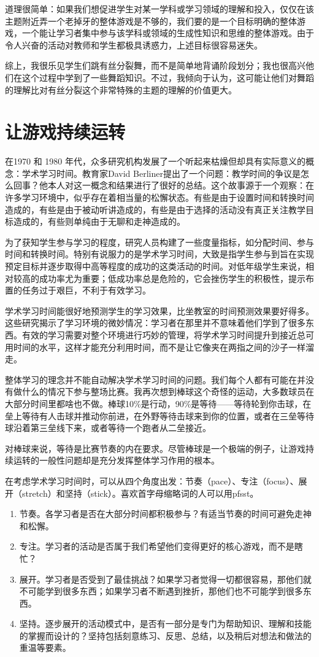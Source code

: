 道理很简单：如果我们想促进学生对某一学科或学习领域的理解和投入，仅仅在该主题附近弄一个老掉牙的整体游戏是不够的，我们要的是一个目标明确的整体游戏，一个能让学习者集中参与该学科或领域的生成性知识和思维的整体游戏。由于令人兴奋的活动对教师和学生都极具诱惑力，上述目标很容易迷失。

综上，我很乐见学生们跳有丝分裂舞，而不是简单地背诵阶段划分；我也很高兴他们在这个过程中学到了一些舞蹈知识。不过，我倾向于认为，这可能让他们对舞蹈的理解比对有丝分裂这个非常特殊的主题的理解的价值更大。

\section*{让游戏持续运转}

在1970 和 1980 年代，众多研究机构发展了一个听起来枯燥但却具有实际意义的概念：学术学习时间。教育家David Berliner提出了一个问题：教学时间的争议是怎么回事？他本人对这一概念和结果进行了很好的总结。这个故事源于一个观察：在许多学习环境中，似乎存在着相当量的松懈状态。有些是由于设置时间和转换时间造成的，有些是由于被动听讲造成的，有些是由于选择的活动没有真正关注教学目标造成的，有些则单纯由于无聊和走神造成的。

为了获知学生参与学习的程度，研究人员构建了一些度量指标，如分配时间、参与时间和转换时间。特别有说服力的是学术学习时间，大致是指学生参与到旨在实现预定目标并逐步取得中高等程度的成功的这类活动的时间。对低年级学生来说，相对较高的成功率尤为重要；低成功率总是危险的，它会挫伤学生的积极性，提示布置的任务过于艰巨，不利于有效学习。

学术学习时间能很好地预测学生的学习效果，比坐教室的时间预测效果要好得多。这些研究揭示了学习环境的微妙情况：学习者在那里并不意味着他们学到了很多东西。有效的学习需要对整个环境进行巧妙的管理，将学术学习时间提升到接近总可用时间的水平，这样才能充分利用时间，而不是让它像夹在两指之间的沙子一样溜走。

整体学习的理念并不能自动解决学术学习时间的问题。我们每个人都有可能在并没有做什么的情况下参与整场比赛。我再次想到棒球这个奇怪的运动，大多数球员在大部分时间里都啥也不做。棒球10\%是行动，90\%是等待——等待轮到你击球，在垒上等待有人击球并推动你前进，在外野等待击球来到你的位置，或者在三垒等待球沿着第三垒线下来，或者等待一个跑者从二垒接近。

对棒球来说，等待是比赛节奏的内在要求。尽管棒球是一个极端的例子，让游戏持续运转的一般性问题却是充分发挥整体学习作用的根本。

在考虑学术学习时间时，可以从四个角度出发：节奏（pace）、专注（focus）、展开（stretch）和坚持（stick）。喜欢首字母缩略词的人可以用pfsst。
\begin{enumerate}
    \item 节奏。各学习者是否在大部分时间都积极参与？有适当节奏的时间可避免走神和松懈。
    \item 专注。学习者的活动是否属于我们希望他们变得更好的核心游戏，而不是瞎忙？
    \item 展开。学习者是否受到了最佳挑战？如果学习者觉得一切都很容易，那他们就不可能学到很多东西；如果学习者不断遇到挫折，那他们也不可能学到很多东西。
    \item 坚持。逐步展开的活动模式中，是否有一部分是专门为帮助知识、理解和技能的掌握而设计的？坚持包括刻意练习、反思、总结，以及稍后对想法和做法的重温等要素。
\end{enumerate}


